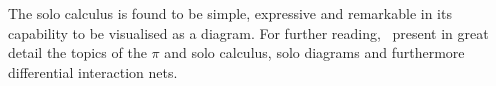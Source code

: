     \begin{remarks}
        The solo calculus is found to be simple, expressive and remarkable in its capability to be visualised as a diagram.
        For further reading,~\cite{acyclic-solos} present in great detail the topics of the $\pi$ and solo calculus, solo diagrams and furthermore differential interaction nets.
    \end{remarks}


